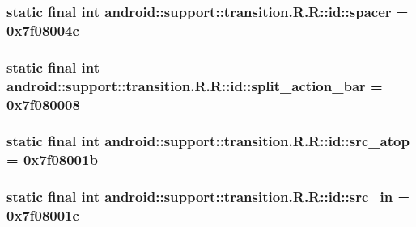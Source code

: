 \hypertarget{classandroid_1_1support_1_1transition_1_1_r_1_1id_e9dbb5b8843146dbfe9187bf280eaf08}{
\subsubsection[{spacer}]{\setlength{\rightskip}{0pt plus 5cm}static final int android::support::transition.R.R::id::spacer = 0x7f08004c}}
\label{classandroid_1_1support_1_1transition_1_1_r_1_1id_e9dbb5b8843146dbfe9187bf280eaf08}


\hypertarget{classandroid_1_1support_1_1transition_1_1_r_1_1id_51a5bc2b098c781a2fb951150fa9f4b1}{
\subsubsection[{split\_\-action\_\-bar}]{\setlength{\rightskip}{0pt plus 5cm}static final int android::support::transition.R.R::id::split\_\-action\_\-bar = 0x7f080008}}
\label{classandroid_1_1support_1_1transition_1_1_r_1_1id_51a5bc2b098c781a2fb951150fa9f4b1}


\hypertarget{classandroid_1_1support_1_1transition_1_1_r_1_1id_cc03b5493e724f83db7bd41d6265e546}{
\subsubsection[{src\_\-atop}]{\setlength{\rightskip}{0pt plus 5cm}static final int android::support::transition.R.R::id::src\_\-atop = 0x7f08001b}}
\label{classandroid_1_1support_1_1transition_1_1_r_1_1id_cc03b5493e724f83db7bd41d6265e546}


\hypertarget{classandroid_1_1support_1_1transition_1_1_r_1_1id_56c2bd0d9e2c21a0a38885cb649e86d5}{
\subsubsection[{src\_\-in}]{\setlength{\rightskip}{0pt plus 5cm}static final int android::support::transition.R.R::id::src\_\-in = 0x7f08001c}}
\label{classandroid_1_1support_1_1transition_1_1_r_1_1id_56c2bd0d9e2c21a0a38885cb649e86d5}


